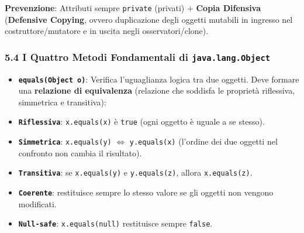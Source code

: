 \textbf{Prevenzione}: Attributi sempre \texttt{private} (privati) + \textbf{Copia Difensiva} (\textbf{Defensive Copying}, ovvero duplicazione degli oggetti mutabili in ingresso nel costruttore/mutatore e in uscita negli osservatori/clone).

\subsubsection{5.4 I Quattro Metodi Fondamentali di \texttt{java.lang.Object}}\label{5-4-i-quattro-metodi-fondamentali-di-java-lang-object}

\begin{itemize}

\item \textbf{\texttt{equals(Object o)}}: Verifica l'uguaglianza logica tra due oggetti. Deve formare una \textbf{relazione di equivalenza} (relazione che soddisfa le proprietà riflessiva, simmetrica e transitiva):

\item \textbf{\texttt{Riflessiva}}: \texttt{x.equals(x)} è \texttt{true} (ogni oggetto è uguale a se stesso).



\item \textbf{\texttt{Simmetrica}}: \texttt{x.equals(y)} $\iff$ \texttt{y.equals(x)} (l'ordine dei due oggetti nel confronto non cambia il risultato).



\item \textbf{\texttt{Transitiva}}: se \texttt{x.equals(y)} e \texttt{y.equals(z)}, allora \texttt{x.equals(z)}.



\item \textbf{\texttt{Coerente}}: restituisce sempre lo stesso valore se gli oggetti non vengono modificati.



\item \textbf{\texttt{Null-safe}}: \texttt{x.equals(null)} restituisce sempre \texttt{false}.

\end{itemize}

